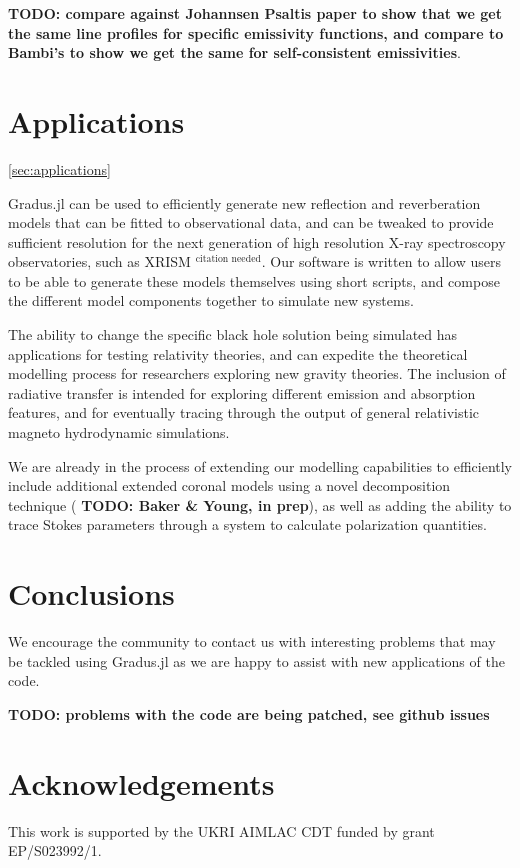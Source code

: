 \documentclass[fleqn,usenatbib]{mnras}
\newcommand{\citneeded}{{\bf \color{red} $^{\text{citation needed}}$}}
\newcommand{\todo}[1]{{\noindent \bf \color{red} TODO: #1}}
\newcommand{\Gradus}{Gradus.jl }
\begin{document}
\todo{compare against Johannsen Psaltis paper to show that we get the same line profiles for specific emissivity functions, and compare to Bambi's to show we get the same for self-consistent emissivities}.

\section{Applications}
\ref{sec:applications}

\Gradus can be used to efficiently generate new reflection and reverberation
models that can be fitted to observational data, and can be tweaked to provide
sufficient resolution for the next generation of high resolution X-ray
spectroscopy observatories, such as XRISM\citneeded. Our software is written to
allow users to be able to generate these models themselves using short scripts,
and compose the different model components together to simulate new systems.

The ability to change the specific black hole solution being simulated has
applications for testing relativity theories, and can expedite the theoretical
modelling process for researchers exploring new gravity theories. The inclusion
of radiative transfer is intended for exploring different emission and
absorption features, and for eventually tracing through the output of general
relativistic magneto hydrodynamic simulations.

We are already in the process of extending our modelling capabilities to
efficiently include additional extended coronal models using a novel
decomposition technique (\todo{Baker \& Young, in prep}), as well as adding
the ability to trace Stokes parameters through a system to calculate
polarization quantities.

\section{Conclusions}
\label{sec:conclusion}

We encourage the community to contact us with interesting problems that may be tackled using \Gradus as we are happy to assist with new applications of the code.

\todo{problems with the code are being patched, see github issues}

\section*{Acknowledgements}
This work is supported by the UKRI AIMLAC CDT funded by grant EP/S023992/1.
\end{document}

